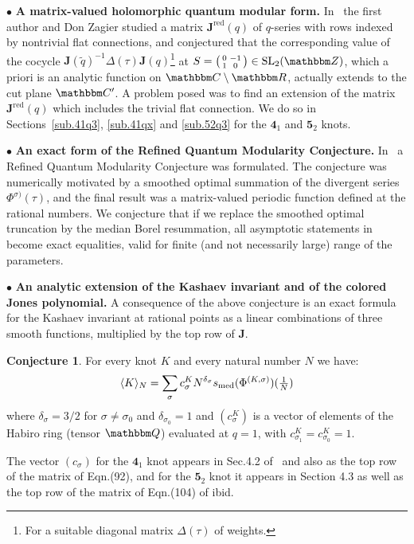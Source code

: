 \documentclass[12pt,reqno]{amsart}
\theoremstyle{definition}
\newtheorem{conjecture}[theorem]{Conjecture}
\def\BZ{\mathbbm Z}
\def\BQ{\mathbbm Q}
\def\BR{\mathbbm R}
\def\BC{\mathbbm C}
\def\s{\sigma}
\def\SL{\mathrm{SL}}
\def\tq{\tilde{q}}
\def\be{\begin{equation}}
\def\ee{\end{equation}}
\def\sma#1#2#3#4{\bigl(\smallmatrix#1&#2\\#3&#4\endsmallmatrix\bigr)}
\def\bJ{\mathbf J}
\def\RED{\mathrm{red}}
\def\sma#1#2#3#4{\bigl(\smallmatrix#1&#2\\#3&#4\endsmallmatrix\bigr)}  %
\def\md{\mathbf}
\newcommand{\knot}[1]{\md{#1}}
\begin{document}
\noindent $\bullet$ {\bf A matrix-valued holomorphic quantum modular
  form.}  In~\cite{GZ:qseries} the first author and Don Zagier studied
a matrix $\bJ^\RED(q)$ of $q$-series with rows indexed by nontrivial
flat connections, and conjectured that the corresponding value of the
cocycle $\bJ(\tq)^{-1} \Delta(\tau) \bJ(q)$\footnote{For a suitable
  diagonal matrix $\Delta(\tau)$ of weights.} at
$S=\sma 0{-1}10 \in \SL_2(\BZ)$, which a priori is an analytic
function on $\BC\setminus\BR$, actually extends to the cut plane
$\BC'$. A problem posed was to find an extension of the matrix
$\bJ^\RED(q)$ which includes the trivial flat connection. We do so in
Sections~\ref{sub.41q3}, \ref{sub.41qx} and \ref{sub.52q3} for the
$\knot{4}_1$ and $\knot{5}_2$ knots.

\noindent $\bullet$ {\bf An exact form of the Refined Quantum Modularity Conjecture.}
In~\cite{GZ:kashaev} a Refined Quantum Modularity Conjecture was formulated. The
conjecture was numerically motivated by a smoothed optimal summation of the
divergent series $\Phi^{\s)}(\tau)$, and the final result was a matrix-valued 
periodic function defined at the rational numbers. We conjecture that if we replace
the smoothed optimal truncation by the median Borel resummation, all asymptotic
statements in~\cite{GZ:kashaev} become exact equalities, valid for finite (and not
necessarily large) range of the parameters. 
  
\noindent $\bullet$ {\bf An analytic extension of the Kashaev invariant and of
the colored Jones polynomial.} 
A consequence of the above conjecture is an exact formula for the Kashaev
  invariant at rational points as a linear combinations of three
  smooth functions, multiplied by the top row of $\bJ$.

\begin{conjecture}
  \label{conj.ekashaev}
  For every knot $K$ and every natural number $N$ we have:
  \be
  \label{ekashaev}
  \langle K \rangle_N = \sum_{\s} c^K_\s N^{\delta_\s} 
  s_{\rm med}( \Phi^{(K,\s)})(\tfrac{1}{N})  
  \ee
  where $\delta_\s=3/2$ for $\s\neq \s_0$ and $\delta_{\s_0}=1$ and
  $(c^K_\s)$ is a vector of elements of the Habiro ring
  (tensor $\BQ$) evaluated at $q=1$, with $c^K_{\s_1}=c^K_{\s_0}=1$. 
\end{conjecture}
The vector $(c_\s)$ for the $\knot{4}_1$ knot appears in Sec.4.2 of~\cite{GZ:kashaev}
and also as the top row of the matrix of Eqn.(92), and for the $\knot{5}_2$ knot it
appears in Section 4.3 as well as the top row of the matrix of Eqn.(104) of ibid.
\end{document}
